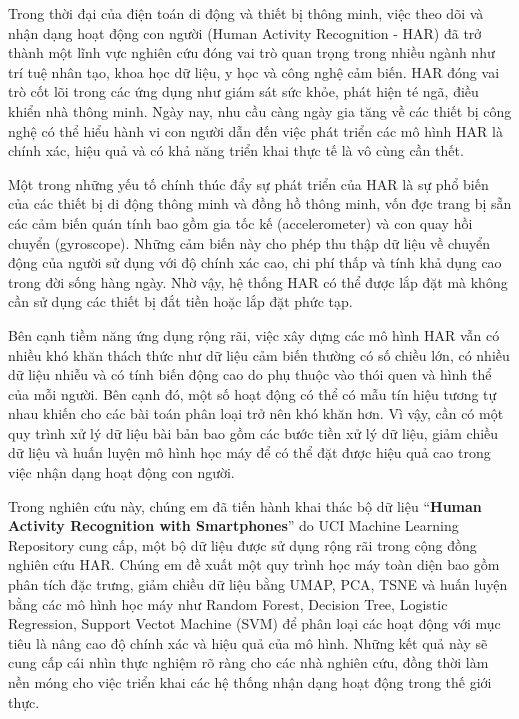 \documentclass[
]{article}
\begin{document}
Trong thời đại của điện toán di động và thiết bị thông minh, việc theo
dõi và nhận dạng hoạt động con người (Human Activity Recognition - HAR)
đã trở thành một lĩnh vực nghiên cứu đóng vai trò quan trọng trong nhiều
ngành như trí tuệ nhân tạo, khoa học dữ liệu, y học và công nghệ cảm
biến. HAR đóng vai trò cốt lõi trong các ứng dụng như giám sát sức khỏe,
phát hiện té ngã, điều khiển nhà thông minh. Ngày nay, nhu cầu càng ngày
gia tăng về các thiết bị công nghệ có thể hiểu hành vi con người dẫn đến
việc phát triển các mô hình HAR là chính xác, hiệu quả và có khả năng
triển khai thực tế là vô cùng cần thết.

Một trong những yếu tố chính thúc đẩy sự phát triển của HAR là sự phổ
biến của các thiết bị di động thông minh và đồng hồ thông minh, vốn đợc
trang bị sẵn các cảm biến quán tính bao gồm gia tốc kế (accelerometer)
và con quay hồi chuyển (gyroscope). Những cảm biến này cho phép thu thập
dữ liệu về chuyển động của người sử dụng với độ chính xác cao, chi phí
thấp và tính khả dụng cao trong đời sống hàng ngày. Nhờ vậy, hệ thống
HAR có thể được lắp đặt mà không cần sử dụng các thiết bị đắt tiền hoặc
lắp đặt phức tạp.

Bên cạnh tiềm năng ứng dụng rộng rãi, việc xây dựng các mô hình HAR vẫn
có nhiều khó khăn thách thức như dữ liệu cảm biến thường có số chiều
lớn, có nhiều dữ liệu nhiễu và có tính biến động cao do phụ thuộc vào
thói quen và hình thể của mỗi người. Bên cạnh đó, một số hoạt động có
thể có mẫu tín hiệu tương tự nhau khiến cho các bài toán phân loại trở
nên khó khăn hơn. Vì vậy, cần có một quy trình xử lý dữ liệu bài bản bao
gồm các bước tiền xử lý dữ liệu, giảm chiều dữ liệu và huấn luyện mô
hình học máy để có thể đặt được hiệu quả cao trong việc nhận dạng hoạt
động con người.

Trong nghiên cứu này, chúng em đã tiến hành khai thác bộ dữ liệu
``\textbf{Human Activity Recognition with Smartphones}'' do UCI Machine
Learning Repository cung cấp, một bộ dữ liệu được sử dụng rộng rãi trong
cộng đồng nghiên cứu HAR. Chúng em đề xuất một quy trình học máy toàn
diện bao gồm phân tích đặc trưng, giảm chiều dữ liệu bằng UMAP, PCA,
TSNE và huấn luyện bằng các mô hình học máy như Random Forest, Decision
Tree, Logistic Regression, Support Vectot Machine (SVM) để phân loại các
hoạt động với mục tiêu là nâng cao độ chính xác và hiệu quả của mô hình.
Những kết quả này sẽ cung cấp cái nhìn thực nghiệm rõ ràng cho các nhà
nghiên cứu, đồng thời làm nền móng cho việc triển khai các hệ thống nhận
dạng hoạt động trong thế giới thực.
\end{document}
